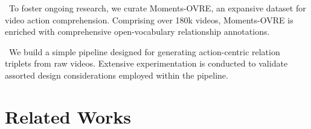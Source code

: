 \documentclass[letterpaper]{article}
\begin{document}
\textbullet \ To foster ongoing research, we curate Moments-OVRE, an expansive dataset for video action comprehension. Comprising over 180k videos, Moments-OVRE is enriched with comprehensive open-vocabulary relationship annotations.

\textbullet \ We build a simple pipeline designed for generating action-centric relation triplets from raw videos. Extensive experimentation is conducted to validate assorted design considerations employed within the pipeline.


\section{Related Works}











\end{document}
